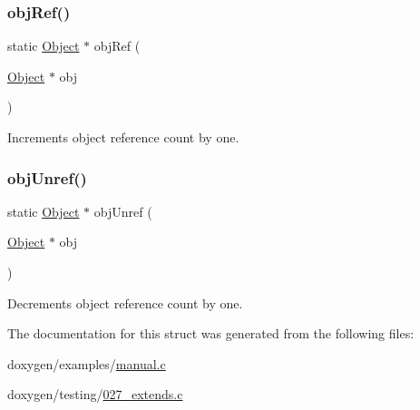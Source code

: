 \subsubsection{\texorpdfstring{objRef()}{objRef()}}
{\footnotesize\ttfamily static \mbox{\hyperlink{struct_object}{Object}} $\ast$ obj\+Ref (\begin{DoxyParamCaption}\item[{\mbox{\hyperlink{struct_object}{Object}} $\ast$}]{obj }\end{DoxyParamCaption})}

Increments object reference count by one. \mbox{\label{struct_object_a924ee0cecc906d148022b3f0d6325cfb}} 
\subsubsection{\texorpdfstring{objUnref()}{objUnref()}}
{\footnotesize\ttfamily static \mbox{\hyperlink{struct_object}{Object}} $\ast$ obj\+Unref (\begin{DoxyParamCaption}\item[{\mbox{\hyperlink{struct_object}{Object}} $\ast$}]{obj }\end{DoxyParamCaption})}

Decrements object reference count by one. 

The documentation for this struct was generated from the following files\+:\begin{DoxyCompactItemize}
\item 
doxygen/examples/\mbox{\hyperlink{manual_8c}{manual.\+c}}\item 
doxygen/testing/\mbox{\hyperlink{027__extends_8c}{027\+\_\+extends.\+c}}\end{DoxyCompactItemize}
